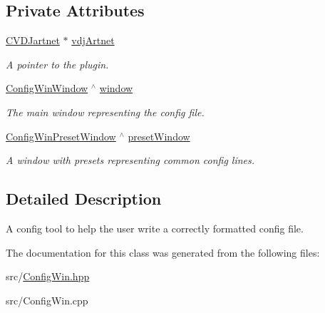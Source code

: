 \subsection*{Private Attributes}
\begin{DoxyCompactItemize}
\item 
\mbox{\label{classConfigWinTool_a3dc8349b61bb9da1c299a56a1397b7bf}} 
\hyperlink{classCVDJartnet}{C\+V\+D\+Jartnet} $\ast$ \hyperlink{classConfigWinTool_a3dc8349b61bb9da1c299a56a1397b7bf}{vdj\+Artnet}
\begin{DoxyCompactList}\small\item\em A pointer to the plugin. \end{DoxyCompactList}\item 
\mbox{\label{classConfigWinTool_af36be9ee4967921063c85c2e715610d9}} 
\hyperlink{classConfigWinWindow}{Config\+Win\+Window} $^\wedge$ \hyperlink{classConfigWinTool_af36be9ee4967921063c85c2e715610d9}{window}
\begin{DoxyCompactList}\small\item\em The main window representing the config file. \end{DoxyCompactList}\item 
\mbox{\label{classConfigWinTool_a95d26aef64982f0ed56b9db4d3694d6f}} 
\hyperlink{classConfigWinPresetWindow}{Config\+Win\+Preset\+Window} $^\wedge$ \hyperlink{classConfigWinTool_a95d26aef64982f0ed56b9db4d3694d6f}{preset\+Window}
\begin{DoxyCompactList}\small\item\em A window with presets representing common config lines. \end{DoxyCompactList}\end{DoxyCompactItemize}


\subsection{Detailed Description}
A config tool to help the user write a correctly formatted config file. 

The documentation for this class was generated from the following files\+:\begin{DoxyCompactItemize}
\item 
src/\hyperlink{ConfigWin_8hpp}{Config\+Win.\+hpp}\item 
src/Config\+Win.\+cpp\end{DoxyCompactItemize}
